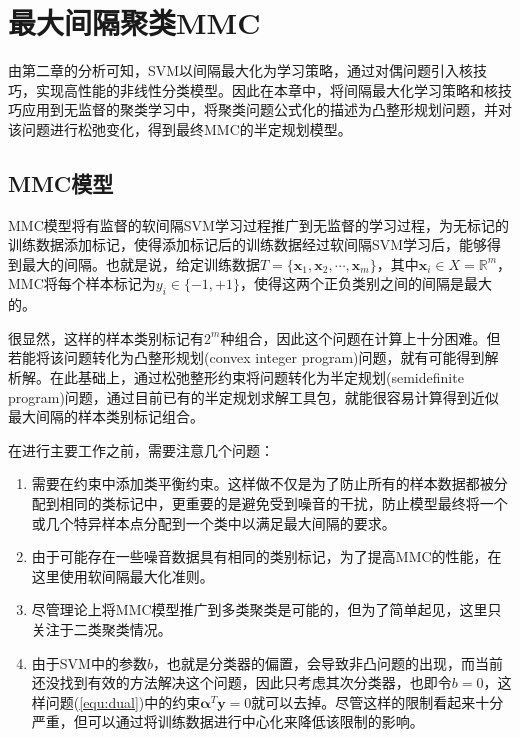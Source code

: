 \chapter{最大间隔聚类MMC}
由第二章的分析可知，SVM以间隔最大化为学习策略，通过对偶问题引入核技巧，实现高性能的非线性分类模型。因此在本章中，将间隔最大化学习策略和核技巧应用到无监督的聚类学习中，将聚类问题公式化的描述为凸整形规划问题，并对该问题进行松弛变化，得到最终MMC的半定规划模型。

\section{MMC模型}
MMC模型将有监督的软间隔SVM学习过程推广到无监督的学习过程，为无标记的训练数据添加标记，使得添加标记后的训练数据经过软间隔SVM学习后，能够得到最大的间隔。也就是说，给定训练数据$T=\{\mathbf{x}_1,\mathbf{x}_2,\cdots,\mathbf{x}_m\}$，其中$\mathbf{x}_i\in X = \mathbb{R}^m$，MMC将每个样本标记为$y_i\in \{-1,+1\}$，使得这两个正负类别之间的间隔是最大的。

很显然，这样的样本类别标记有$2^m$种组合，因此这个问题在计算上十分困难。但若能将该问题转化为凸整形规划(convex integer program)问题，就有可能得到解析解。在此基础上，通过松弛整形约束将问题转化为半定规划(semidefinite program)问题，通过目前已有的半定规划求解工具包，就能很容易计算得到近似最大间隔的样本类别标记组合。

在进行主要工作之前，需要注意几个问题：
\begin{enumerate}[fullwidth,itemindent=24pt]
  \item 需要在约束中添加类平衡约束。这样做不仅是为了防止所有的样本数据都被分配到相同的类标记中，更重要的是避免受到噪音的干扰，防止模型最终将一个或几个特异样本点分配到一个类中以满足最大间隔的要求。
  \item 由于可能存在一些噪音数据具有相同的类别标记，为了提高MMC的性能，在这里使用软间隔最大化准则。
  \item 尽管理论上将MMC模型推广到多类聚类是可能的，但为了简单起见，这里只关注于二类聚类情况。
  \item 由于SVM中的参数$b$，也就是分类器的偏置，会导致非凸问题的出现，而当前还没找到有效的方法解决这个问题，因此只考虑其次分类器，也即令$b=0$，这样问题(\ref{equ:dual})中的约束$\mathbf{\alpha}^T\mathbf{y}=0$就可以去掉。尽管这样的限制看起来十分严重，但可以通过将训练数据进行中心化来降低该限制的影响。
  \end{enumerate}

